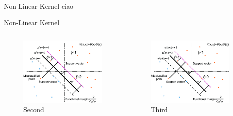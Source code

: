 \begin{frame}[fragile]{Non-Linear Kernel}
  ciao
\end{frame}

\begin{frame}[fragile]{Non-Linear Kernel}
  \begin{columns}[onlytextwidth, T, c]
    \begin{column}{.5\textwidth}
        \begin{figure}
            \includegraphics[width=5cm]{assets/images/test.png}
            \caption{Second}
        \end{figure}
    \end{column}
    \begin{column}{.5\textwidth}
        \begin{figure}
            \includegraphics[width=5cm]{assets/images/test.png}
            \caption{Third}
        \end{figure}
    \end{column}    
  \end{columns}
\end{frame}
